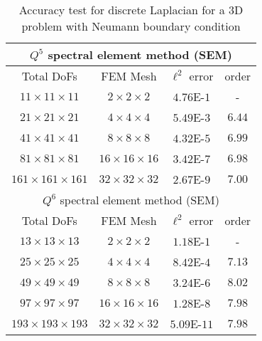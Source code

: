 \begin{table}[!ht]
    \centering
    \begin{tabular}{|c|c|c c|}
    \hline
    \multicolumn{4}{|c|}{$Q^5$ spectral element method (SEM)}\\
    \hline
    Total DoFs & FEM Mesh & $\ell^2$ error & order\\
    \hline
    $11\times 11\times 11$ & $2\times 2 \times 2$ & $4.76$E-$1$ & - \\
    \hline
    $21\times 21\times 21$ & $4\times 4 \times 4$ & $5.49$E-$3$ & $6.44$\\
    \hline
    $41\times 41\times 41$ & $8\times 8 \times 8$ & $4.32$E-$5$ & $6.99$ \\
    \hline
    $81\times 81\times 81$ & $16\times 16 \times 16$ & $3.42$E-$7$ & $6.98$ \\
    \hline
    $161\times 161\times 161$ & $32\times 32 \times 32$ & $2.67$E-$9$ & $7.00$ \\
    \hline
    \multicolumn{4}{|c|}{$Q^6$ spectral element method (SEM)}\\
    \hline
    Total DoFs & FEM Mesh & $\ell^2$ error & order\\
    \hline
    $13\times 13\times 13$ & $2\times 2 \times 2$ & $1.18$E-$1$ & - \\
    \hline
    $25\times 25\times 25$ & $4\times 4 \times 4$ & $8.42$E-$4$ & $7.13$ \\
    \hline
    $49\times 49\times 49$ & $8\times 8 \times 8$ & $3.24$E-$6$ & $8.02$ \\
    \hline
    $97\times 97\times 97$ & $16\times 16 \times 16$ & $1.28$E-$8$ & $7.98$ \\
    \hline
    $193\times 193\times 193$ & $32\times 32 \times 32$ & $5.09$E-$11$ & $7.98$ \\
    \hline
    \end{tabular}
    \caption{Accuracy test for discrete Laplacian for a 3D problem with Neumann boundary condition}
    \label{tab2:accuracy test neumann}
\end{table}
